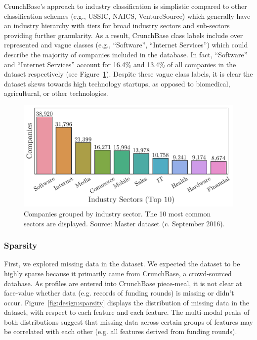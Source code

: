 \documentclass[../thesis/thesis.tex]{subfiles}
\begin{document}
CrunchBase's approach to industry classification is simplistic compared to other classification schemes (e.g., USSIC, NAICS, VentureSource) which generally have an industry hierarchy with tiers for broad industry sectors and sub-sectors providing further granularity. As a result, CrunchBase class labels include over represented and vague classes (e.g., ``Software'', ``Internet Services'') which could describe the majority of companies included in the database. In fact, ``Software'' and ``Internet Services'' account for 16.4\% and 13.4\% of all companies in the dataset respectively (see Figure~\ref{fig:design:industry_counts}). Despite these vague class labels, it is clear the dataset skews towards high technology startups, as opposed to biomedical, agricultural, or other technologies.

\begin{figure}[!htb]
    \centering
    \includegraphics[width=\textwidth]{../figures/design/industry_counts}
    \caption[Companies by industry sector]{Companies grouped by industry sector. The 10 most common sectors are displayed. Source: Master dataset (c. September 2016).}
    \label{fig:design:industry_counts}
\end{figure}

\subsubsection{Sparsity}

First, we explored missing data in the dataset. We expected the dataset to be highly sparse because it primarily came from CrunchBase, a crowd-sourced database. As profiles are entered into CrunchBase piece-meal, it is not clear at face-value whether data (e.g. records of funding rounds) is missing or didn't occur. Figure~\ref{fig:design:sparsity} displays the distribution of missing data in the dataset, with respect to each feature and each feature. The multi-modal peaks of both distributions suggest that missing data across certain groups of features may be correlated with each other (e.g. all features derived from funding rounds).
\end{document}
